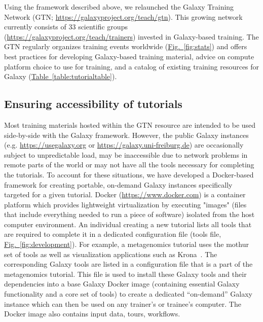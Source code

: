 Using the framework described above, we relaunched the Galaxy Training Network (GTN; \url{https://galaxyproject.org/teach/gtn}). This growing network currently consists of 33 scientific groups (\url{https://galaxyproject.org/teach/trainers}) invested in Galaxy-based training. The GTN regularly organizes training events worldwide (\hyperref[fig:stats]{Fig.~\ref{fig:stats}}) and offers best practices for developing Galaxy-based training material, advice on compute platform choice to use for training, and a catalog of existing training resources for Galaxy (\hyperref[table:tutorialtable]{Table~\ref{table:tutorialtable}}).

\subsection*{Ensuring accessibility of tutorials}
Most training materials hosted within the GTN resource are intended to be used side-by-side with the Galaxy framework. However, the public Galaxy instances (e.g. \url{https://usegalaxy.org} or \url{https://galaxy.uni-freiburg.de}) are occasionally subject to unpredictable load, may be inaccessible due to network problems in remote parts of the world or may not have all the tools necessary for completing the tutorials. To account for these situations, we have developed a Docker-based framework for creating portable, on-demand Galaxy instances specifically targeted for a given tutorial. Docker (\url{https://www.docker.com}) is a container platform which provides lightweight virtualization by executing "images" (files that include everything needed to run a piece of software) isolated from the host computer environment. An individual creating a new tutorial lists all tools that are required to complete it in a dedicated configuration file (tools file, \hyperref[fig:development]{Fig.~\ref{fig:development}}). For example, a metagenomics tutorial uses the mothur~\cite{schloss2009introducing} set of tools as well as visualization applications such as Krona~\cite{ondov2015krona}. The corresponding Galaxy tools are listed in a configuration file that is a part of the metagenomics tutorial. This file is used to install these Galaxy tools and their dependencies into a base Galaxy Docker image (containing essential Galaxy functionality and a core set of tools) to create a dedicated “on-demand” Galaxy instance which can then be used on any trainer’s or trainee’s computer. The Docker image also contains input data, tours, workflows.

